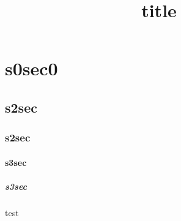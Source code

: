\title{title}
\section{s0sec0}
\subsection{s2sec}
\subsubsection{s2sec}
\paragraph{s3sec}
\subparagraph{s3sec}

test


